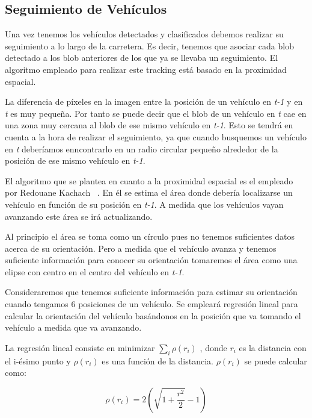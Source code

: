 \subsection{Seguimiento de Vehículos}\label{sec.seguimiento}

Una vez tenemos los vehículos detectados y clasificados debemos realizar su seguimiento a lo largo de la carretera. Es decir, tenemos que asociar cada blob detectado a los blob anteriores de los que ya se llevaba un seguimiento. El algoritmo empleado para realizar este tracking está basado en la proximidad espacial.

La diferencia de píxeles en la imagen entre la posición de un vehículo en \textit{t-1} y en \textit{t} es muy pequeña. Por tanto se puede decir que el blob de un vehículo en \textit{t} cae en una zona muy cercana al blob de ese mismo vehículo en \textit{t-1}. Esto se tendrá en cuenta a la hora de realizar el seguimiento, ya que cuando busquemos un vehículo en \textit{t} deberíamos enncontrarlo en un radio circular pequeño alrededor de la posición de ese mismo vehículo en \textit{t-1}. 

El algoritmo que se plantea en cuanto a la proximidad espacial es el empleado por Redouane Kachach ~\cite{redo_tesis}. En él se estima el área donde debería localizarse un vehículo en función de su posición en \textit{t-1}. A medida que los vehículos vayan avanzando este área se irá actualizando.

Al principio el área se toma como un círculo pues no tenemos suficientes datos acerca de su orientación. Pero a medida que el vehículo avanza y tenemos suficiente información para conocer su orientación tomaremos el área como una elipse con centro en el centro del vehículo en \textit{t-1}. 

Consideraremos que tenemos suficiente información para estimar su orientación cuando tengamos 6 posiciones de un vehículo. Se empleará regresión lineal para calcular la orientación del vehículo basándonos en la posición que va tomando el vehículo a medida que va avanzando. 

La regresión lineal consiste en minimizar $\sum_{i}\rho(r_i)$ , donde $r_i$  es la  distancia  con  el  i-ésimo  punto  y $\rho(r_i)$ es una función de la distancia. $\rho(r_i)$ se puede calcular como:

\begin{equation}\label{ec.regresion_lineal}
   \rho(r_i) = 2(\sqrt{1 +\frac{r^2}{2}} - 1) 
\end{equation}

